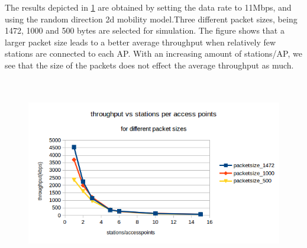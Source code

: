 The results depicted in \ref{fig:throughputvsstationsperaccesspoint-packetsize} are obtained by setting the data rate to 11Mbps, and using the random direction 2d mobility model.Three different packet sizes, being 1472, 1000 and 500 bytes are selected for simulation. The figure shows that a larger packet size leads to a better average throughput when relatively few stations are connected to each AP. With an increasing amount of stations/AP, we see that the size of the packets does not effect the average throughput as much.\\\\    \\                                                                                                           




\begin{figure}[ht!]
\centering
\includegraphics[width=0.8\linewidth]{"figures/throughput vs stations per access point-packetsize"}
\caption[througput vs stations per access node, for various packet sizes]{}
\label{fig:throughputvsstationsperaccesspoint-packetsize}
\end{figure}

